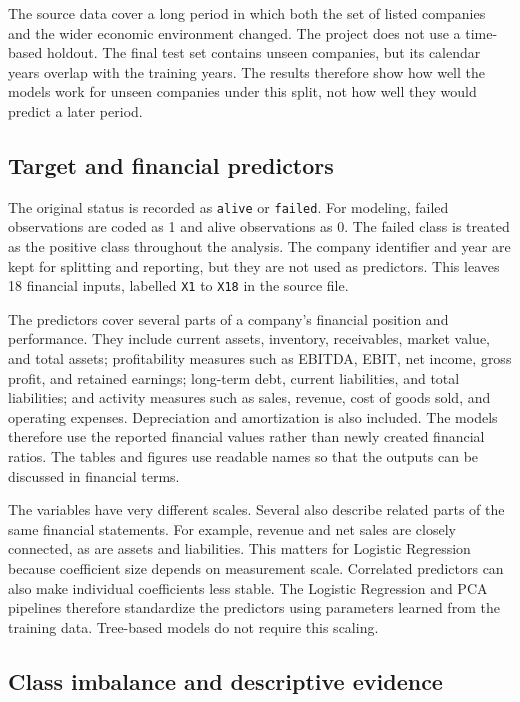 \documentclass[11pt,a4paper]{article}
\begin{document}
The source data cover a long period in which both the set of listed companies
and the wider economic environment changed. The project does not use a
time-based holdout. The final test set contains unseen companies, but its
calendar years overlap with the training years. The results therefore show how
well the models work for unseen companies under this split, not how well they
would predict a later period.

\subsection{Target and financial predictors}

The original status is recorded as \texttt{alive} or \texttt{failed}. For
modeling, failed observations are coded as 1 and alive observations as 0. The
failed class is treated as the positive class throughout the analysis. The
company identifier and year are kept for splitting and reporting, but they are
not used as predictors. This leaves 18 financial inputs, labelled \texttt{X1}
to \texttt{X18} in the source file.

The predictors cover several parts of a company's financial position and
performance. They include current assets, inventory, receivables, market value,
and total assets; profitability measures such as EBITDA, EBIT, net income,
gross profit, and retained earnings; long-term debt, current liabilities, and
total liabilities; and activity measures such as sales, revenue, cost of goods
sold, and operating expenses. Depreciation and amortization is also included.
The models therefore use the reported financial values rather than newly created
financial ratios. The tables and figures use readable names so that the outputs
can be discussed in financial terms.

The variables have very different scales. Several also describe related parts of
the same financial statements. For example, revenue and net sales are closely
connected, as are assets and liabilities. This matters for Logistic Regression
because coefficient size depends on measurement scale. Correlated predictors can
also make individual coefficients less stable. The Logistic Regression and PCA
pipelines therefore standardize the predictors using parameters learned from the
training data. Tree-based models do not require this scaling.

\subsection{Class imbalance and descriptive evidence}
\end{document}
